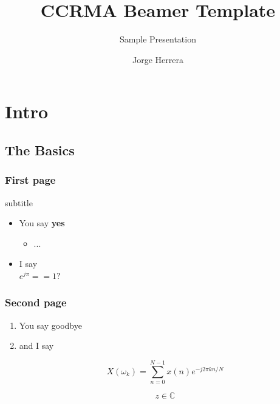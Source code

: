 \documentclass{beamer}
\title{CCRMA Beamer Template}
\subtitle{Sample Presentation}
\author{Jorge Herrera}
\date
\begin{document}
\begin{frame}[plain]
    \titlepage
\end{frame}
\addtocounter{framenumber}{-1}  %


\begin{frame}[plain]
    \tableofcontents
\end{frame}
\addtocounter{framenumber}{-1}  %

\section[Intro]{Intro}
\begin{frame}[plain]
    \tableofcontents[currentsection]
\end{frame}
\addtocounter{framenumber}{-1}  %

\subsection[basics]{The Basics}

\begin{frame}\frametitle{First page}{subtitle}
    \begin{itemize}
    \item You say \textbf{yes}
        \begin{itemize}
        \item ...
        \end{itemize}
    \item I say \\
    \centering
    $e^{j \pi} == 1?$
    \end{itemize}

\end{frame}

\begin{frame}\frametitle{Second page}
    \begin{enumerate}
    \item You say goodbye
    \item and I say

    \begin{equation}
    X(\omega_k) = \sum_{n=0}^{N-1}x(n)e^{-j2\pi kn/N}
    \end{equation}

    \begin{equation}
    z \in \mathbb{C}
    \end{equation}

    \end{enumerate}
\end{frame}
\end{document}
